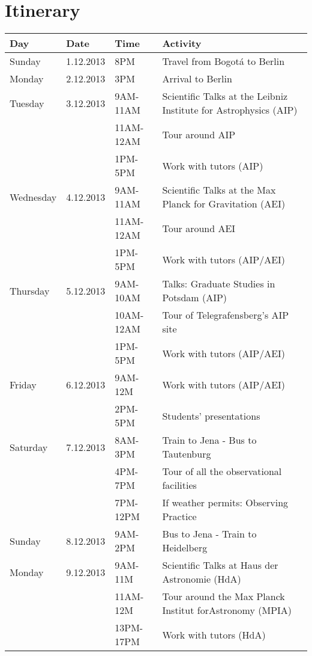 \documentclass[12pt]{article}
\begin{document}
\section{Itinerary}

\begin{tabular}{p{2cm}p{2cm}p{2.5cm}p{7.0cm}}
Day & Date & Time & Activity\\\hline\hline

Sunday & 1.12.2013 & 8PM&	Travel from Bogot\'a to Berlin\\\hline

Monday &2.12.2013& 3PM & Arrival to Berlin\\\hline

Tuesday &3.12.2013& 9AM-11AM & Scientific Talks at the Leibniz Institute for Astrophysics (AIP)\\
 & & 11AM-12AM &Tour around AIP\\
 & & 1PM-5PM & Work with tutors (AIP)\\\hline

Wednesday &4.12.2013& 9AM-11AM &Scientific Talks at the Max Planck
for Gravitation (AEI)\\
 & & 11AM-12AM &Tour around AEI\\
 & & 1PM-5PM & Work with tutors (AIP/AEI)\\\hline

Thursday &5.12.2013 &  9AM-10AM & Talks: Graduate Studies in Potsdam (AIP)\\
& &  10AM-12AM & Tour of Telegrafensberg's AIP site\\
& & 1PM-5PM& Work with tutors (AIP/AEI)\\ \hline

Friday &6.12.2013& 9AM-12M & Work with tutors (AIP/AEI) \\		
      & & 2PM-5PM&  Students' presentations\\\hline

Saturday & 7.12.2013& 8AM-3PM&	Train to Jena - Bus to Tautenburg\\
 & &4PM-7PM & Tour of all the observational facilities\\
 & &7PM-12PM & If weather permits: Observing Practice\\\hline

Sunday &8.12.2013& 9AM-2PM & Bus to Jena - Train to Heidelberg\\\hline

Monday &9.12.2013  & 9AM-11M & Scientific Talks at Haus der
Astronomie (HdA)\\ 
&  & 11AM-12M  & Tour around the Max Planck Institut forAstronomy (MPIA)\\
 & & 13PM-17PM & Work with tutors (HdA)\\\hline


\end{tabular}
\end{document}
